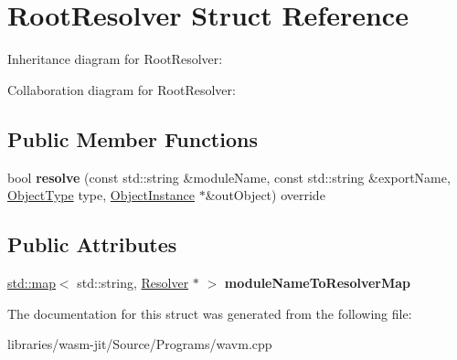 \hypertarget{struct_root_resolver}{}\section{Root\+Resolver Struct Reference}
\label{struct_root_resolver}


Inheritance diagram for Root\+Resolver\+:


Collaboration diagram for Root\+Resolver\+:
\subsection*{Public Member Functions}
\begin{DoxyCompactItemize}
\item 
\mbox{\label{struct_root_resolver_a8872b8330e7a2129eaa8a6e00fb72638}} 
bool {\bfseries resolve} (const std\+::string \&module\+Name, const std\+::string \&export\+Name, \mbox{\hyperlink{struct_i_r_1_1_object_type}{Object\+Type}} type, \mbox{\hyperlink{struct_runtime_1_1_object_instance}{Object\+Instance}} $\ast$\&out\+Object) override
\end{DoxyCompactItemize}
\subsection*{Public Attributes}
\begin{DoxyCompactItemize}
\item 
\mbox{\label{struct_root_resolver_a5d27a0a2ef05ad6566d3440596bb391f}} 
\mbox{\hyperlink{classstd_1_1map}{std\+::map}}$<$ std\+::string, \mbox{\hyperlink{struct_runtime_1_1_resolver}{Resolver}} $\ast$ $>$ {\bfseries module\+Name\+To\+Resolver\+Map}
\end{DoxyCompactItemize}


The documentation for this struct was generated from the following file\+:\begin{DoxyCompactItemize}
\item 
libraries/wasm-\/jit/\+Source/\+Programs/wavm.\+cpp\end{DoxyCompactItemize}
